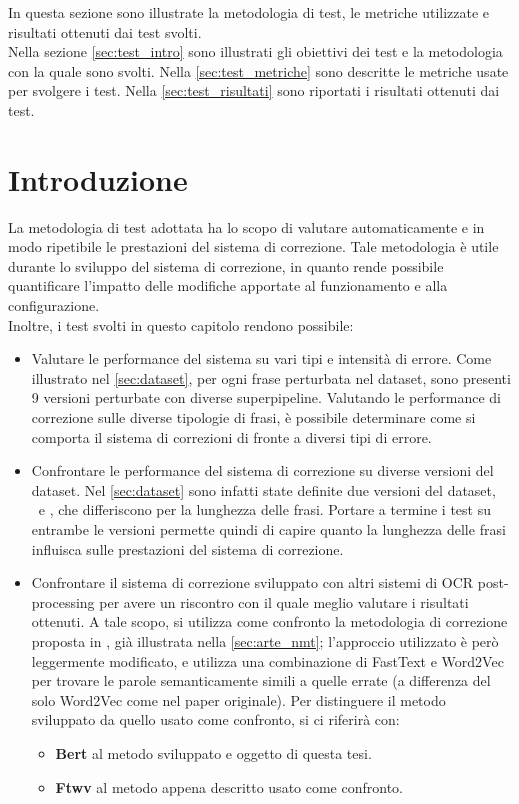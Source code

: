 In questa sezione sono illustrate la metodologia di test, le metriche utilizzate e risultati ottenuti dai test svolti.\\
Nella sezione \autoref{sec:test_intro} sono illustrati gli obiettivi dei test e la metodologia con la quale sono svolti. Nella \autoref{sec:test_metriche} sono descritte le metriche usate per svolgere i test. Nella \autoref{sec:test_risultati} sono riportati i risultati ottenuti dai test.

\section{Introduzione}
\label{sec:test_intro}
La metodologia di test adottata ha lo scopo di valutare automaticamente e in modo ripetibile le prestazioni del sistema di correzione. Tale metodologia è utile durante lo sviluppo del sistema di correzione, in quanto rende possibile quantificare l'impatto delle modifiche apportate al funzionamento e alla configurazione.\\
Inoltre, i test svolti in questo capitolo rendono possibile:
\begin{itemize}
\item Valutare le performance del sistema su vari tipi e intensità di errore. Come illustrato nel \autoref{sec:dataset}, per ogni frase perturbata nel dataset, sono presenti 9 versioni perturbate con diverse superpipeline. Valutando le performance di correzione sulle diverse tipologie di frasi, è possibile determinare come si comporta il sistema di correzioni di fronte a diversi tipi di errore.

\item Confrontare le performance del sistema di correzione su diverse versioni del dataset. Nel \autoref{sec:dataset} sono infatti state definite due versioni del dataset, \dsta\ e \dstb, che differiscono per la lunghezza delle frasi. Portare a termine i test su entrambe le versioni permette quindi di capire quanto la lunghezza delle frasi influisca sulle prestazioni del sistema di correzione.

\item Confrontare il sistema di correzione sviluppato con altri sistemi di OCR post-processing per avere un riscontro con il quale meglio valutare i risultati ottenuti. A tale scopo, si utilizza come confronto la metodologia di correzione proposta in \cite{hamalainen2019paft}, già illustrata nella \autoref{sec:arte_nmt}; l'approccio utilizzato è però leggermente modificato, e utilizza una combinazione di FastText e Word2Vec per trovare le parole semanticamente simili a quelle errate (a differenza del solo Word2Vec come nel paper originale). Per distinguere il metodo sviluppato da quello usato come confronto, si ci riferirà con:
	\begin{itemize}
	\item \textbf{Bert} al metodo sviluppato e oggetto di questa tesi.
	\item \textbf{Ftwv} al metodo appena descritto usato come confronto.
	\end{itemize}

\end{itemize}

